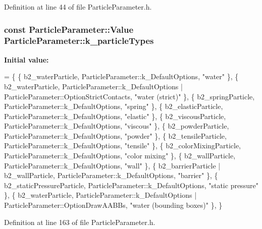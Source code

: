 Definition at line 44 of file Particle\-Parameter.\-h.

\hypertarget{classParticleParameter_a9be397f33beb13283cb2f1fe469c62d6}{
\subsubsection[{k\-\_\-particle\-Types}]{\setlength{\rightskip}{0pt plus 5cm}const {\bf Particle\-Parameter\-::\-Value} Particle\-Parameter\-::k\-\_\-particle\-Types\hspace{0.3cm}{\ttfamily [static]}}}\label{classParticleParameter_a9be397f33beb13283cb2f1fe469c62d6}
{\bfseries Initial value\-:}
\begin{DoxyCode}
=
\{
    \{ b2\_waterParticle, ParticleParameter::k\_DefaultOptions, \textcolor{stringliteral}{"water"} \},
    \{ b2\_waterParticle, ParticleParameter::k\_DefaultOptions |
                ParticleParameter::OptionStrictContacts, \textcolor{stringliteral}{"water (strict)"} \},
    \{ b2\_springParticle, ParticleParameter::k\_DefaultOptions, \textcolor{stringliteral}{"spring"} \},
    \{ b2\_elasticParticle, ParticleParameter::k\_DefaultOptions, \textcolor{stringliteral}{"elastic"} \},
    \{ b2\_viscousParticle, ParticleParameter::k\_DefaultOptions, \textcolor{stringliteral}{"viscous"} \},
    \{ b2\_powderParticle, ParticleParameter::k\_DefaultOptions, \textcolor{stringliteral}{"powder"} \},
    \{ b2\_tensileParticle, ParticleParameter::k\_DefaultOptions, \textcolor{stringliteral}{"tensile"} \},
    \{ b2\_colorMixingParticle, ParticleParameter::k\_DefaultOptions,
        \textcolor{stringliteral}{"color mixing"} \},
    \{ b2\_wallParticle, ParticleParameter::k\_DefaultOptions, \textcolor{stringliteral}{"wall"} \},
    \{ b2\_barrierParticle | b2\_wallParticle,
        ParticleParameter::k\_DefaultOptions, \textcolor{stringliteral}{"barrier"} \},
    \{ b2\_staticPressureParticle, ParticleParameter::k\_DefaultOptions,
        \textcolor{stringliteral}{"static pressure"} \},
    \{ b2\_waterParticle, ParticleParameter::k\_DefaultOptions |
                ParticleParameter::OptionDrawAABBs, \textcolor{stringliteral}{"water (bounding boxes)"} \},
\}
\end{DoxyCode}


Definition at line 163 of file Particle\-Parameter.\-h.

